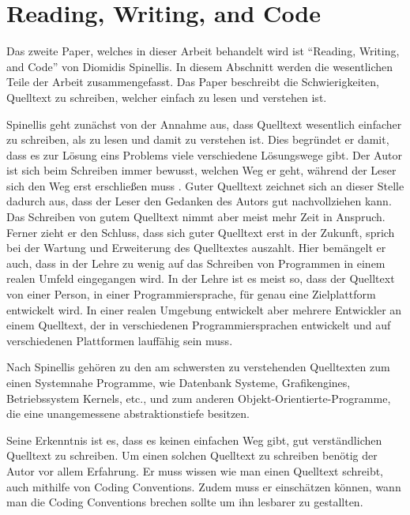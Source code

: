 \section{Reading, Writing, and Code}
Das zweite Paper, welches in dieser Arbeit behandelt wird ist \enquote{Reading, Writing, and Code} von Diomidis Spinellis\cite{Spinellis}. In diesem Abschnitt werden die wesentlichen Teile der Arbeit zusammengefasst. Das Paper beschreibt die Schwierigkeiten, Quelltext zu schreiben, welcher einfach zu lesen und verstehen ist. 

Spinellis geht zunächst von der Annahme aus, dass Quelltext wesentlich einfacher zu schreiben, als zu lesen und damit zu verstehen ist. Dies begründet er damit, dass es zur Lösung eins Problems viele verschiedene Lösungswege gibt. Der Autor ist sich beim Schreiben immer bewusst, welchen Weg er geht, während der Leser sich den Weg erst erschließen muss \cite[S. 85]{Spinellis}. Guter Quelltext zeichnet sich an dieser Stelle dadurch aus, dass der Leser den Gedanken des Autors gut nachvollziehen kann. Das Schreiben von gutem Quelltext nimmt aber meist mehr Zeit in Anspruch. Ferner zieht er den Schluss, dass sich guter Quelltext erst in der Zukunft, sprich bei der Wartung und Erweiterung des Quelltextes auszahlt\cite[S. 86]{Spinellis}. Hier bemängelt er auch, dass in der Lehre zu wenig auf das Schreiben von Programmen in einem realen Umfeld eingegangen wird. In der Lehre ist es meist so, dass der Quelltext von einer Person, in einer Programmiersprache, für genau eine Zielplattform entwickelt wird. In einer realen Umgebung entwickelt aber mehrere Entwickler an einem Quelltext, der in verschiedenen Programmiersprachen entwickelt und auf verschiedenen Plattformen lauffähig sein muss. \cite[S. 86]{Spinellis}

Nach Spinellis gehören zu den am schwersten zu verstehenden Quelltexten zum einen Systemnahe Programme, wie Datenbank Systeme, Grafikengines, Betriebssystem Kernels, etc., und zum anderen Objekt-Orientierte-Programme, die eine unangemessene abstraktionstiefe besitzen. \cite[S. 86]{Spinellis}

Seine Erkenntnis ist es, dass es keinen einfachen Weg gibt, gut verständlichen Quelltext zu schreiben. Um einen solchen Quelltext zu schreiben benötig der Autor vor allem Erfahrung. Er muss wissen wie man einen Quelltext schreibt, auch mithilfe von Coding Conventions. Zudem muss er einschätzen können, wann man die Coding Conventions brechen sollte um ihn lesbarer zu gestallten. \cite[S. 86]{Spinellis}

